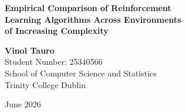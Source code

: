 \documentclass[a4paper,12pt]{article}
\begin{document}

\begin{titlepage}
\centering
\vspace*{2cm}

{\Huge\bfseries\color{tcdBlue}
Empirical Comparison of Reinforcement\\[0.3em]
Learning Algorithms Across Environments\\[0.3em]
of Increasing Complexity
\par}

\vspace{1.5cm}

\vspace{2cm}

{\large
\textbf{Vinol Tauro}\\[0.3em]
Student Number: 25340566\\[0.3em]
School of Computer Science and Statistics\\
Trinity College Dublin
\par}

\vspace{2cm}

{\large June 2026\par}

\end{titlepage}
\end{document}
